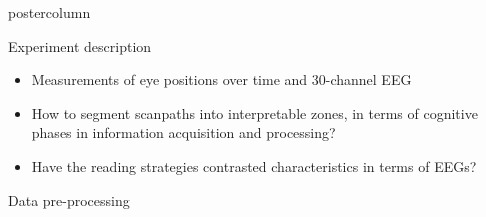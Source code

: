 \documentclass[final,hyperref={pdfpagelabels=false}]{beamer}
\begin{document}
\begin{frame}
\begin{columns}
\begin{column}{.49\textwidth}
\begin{beamercolorbox}[center,wd=\textwidth]{postercolumn}
\begin{minipage}[T]{.95\textwidth}
{\begin{block}{Experiment description}
                \begin{itemize}
                    \item[\bullet] Measurements of eye positions over time and 30-channel EEG
                    \vskip1cm
                    \item[\hookrightarrow] How to segment scanpaths into interpretable zones, in terms of cognitive phases in information acquisition and processing?
                    \item[\hookrightarrow] Have the reading strategies contrasted characteristics in terms of EEGs?
                \end{itemize}
            \end{block}
            \vfill
            \begin{block}{Data pre-processing}


\end{block}}
\end{minipage}
\end{beamercolorbox}
\end{column}
\end{columns}
\end{frame}
\end{document}
